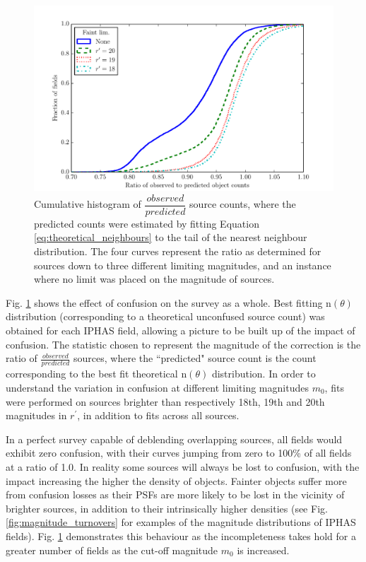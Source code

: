 \documentclass[a4paper,useAMS,usenatbib]{mn2e}
\begin{document}
\begin{figure}
\begin{center}
\includegraphics[width=1\linewidth]{figures/confusion_completeness.pdf} 
\caption{\footnotesize Cumulative histogram of $\dfrac{observed}{predicted}$ 
source counts, where the predicted counts were estimated by fitting Equation 
\ref{eq:theoretical_neighbours} to the tail of the nearest neighbour 
distribution. The four curves represent the ratio as determined for sources 
down to three different limiting magnitudes, and an instance where no limit 
was placed on the magnitude of sources.}
\label{fig:confusion_completeness}
\end{center}
\end{figure}

Fig. \ref{fig:confusion_completeness} shows the effect of confusion on the
survey as a whole. Best fitting n$(\theta)$ distribution (corresponding to a
theoretical unconfused source count) was obtained for each IPHAS field, allowing a 
picture to be built up of the impact of confusion. The statistic chosen to 
represent the magnitude of the correction is the ratio of $\frac{observed}{predicted}$ 
sources, where the ``predicted" source count is the count corresponding to the 
best fit theoretical n$(\theta)$ distribution. In order to understand the variation 
in confusion at different limiting magnitudes $m_0$, fits were performed on sources 
brighter than respectively 18th, 19th and 20th magnitudes in $r^{\prime}$, in addition 
to fits across all sources.

In a perfect survey capable of deblending overlapping sources, all fields would
exhibit zero confusion, with their curves jumping from zero to 100\% of all
fields at a ratio of 1.0. In reality some sources will always be lost to
confusion, with the impact increasing the higher the density of objects. Fainter 
objects suffer more from confusion losses as their PSFs are more likely to be 
lost in the vicinity of brighter sources, in addition to their intrinsically higher 
densities (see Fig. \ref{fig:magnitude_turnovers} for examples of the magnitude distributions 
of IPHAS fields). Fig. \ref{fig:confusion_completeness} demonstrates this behaviour as the 
incompleteness takes hold for a greater number of fields as the cut-off magnitude $m_0$ 
is increased.
\end{document}

